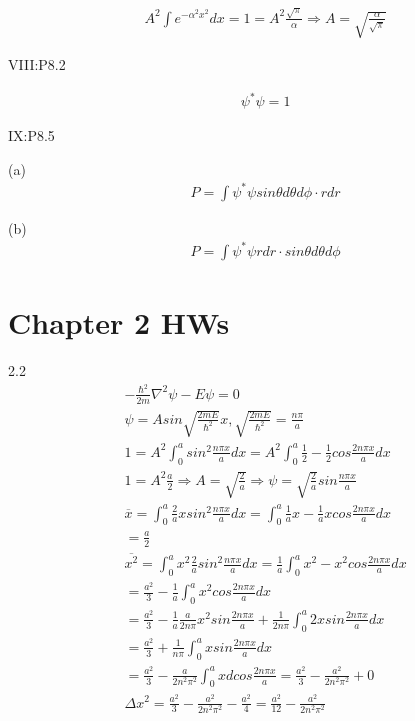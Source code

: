 \documentclass{article}
\begin{document}
  \begin{align*}
    & A^2\int e^{-\alpha^2 x^2}dx=1=A^2\frac{\sqrt{\pi}}{\alpha}\Rightarrow A=\sqrt{\frac{\alpha}{\sqrt{\pi}}}
  \end{align*}

  VIII:P8.2 

  \begin{align*}
    & \psi^*\psi=1
  \end{align*}


  IX:P8.5 

  (a)\begin{align*}
    &P=\int \psi^* \psi sin\theta d\theta d\phi \cdot rdr
  \end{align*}

  (b)\begin{align*}
  & P=\int \psi^*\psi rdr \cdot sin\theta d\theta d\phi
  \end{align*}
  \section{Chapter 2 HWs}
  2.2\begin{align*}
    & -\frac{\hbar^2}{2m}\nabla^2\psi-E\psi=0 \\
    &\psi =Asin\sqrt{\frac{2mE}{\hbar^2}}x,\sqrt{\frac{2mE}{\hbar^2}}=\frac{n\pi}a \\
    &1=A^2\int ^a_0 sin^2\frac{n\pi x}a dx=A^2\int^a_0 \frac12 -\frac12cos\frac{2n\pi x}adx\\
    & 1=A^2 \frac a2\Rightarrow A=\sqrt{\frac2a}\Rightarrow \psi=\sqrt{\frac2a}sin\frac{n\pi x}a \\
    &\overline {x}=\int^a_0 \frac2a x sin^2\frac{n\pi x}a dx=\int^a_0\frac1a x-\frac1axcos\frac{2n\pi x}a dx \\
    & =\frac a2  \\
    &\overline{x^2}=\int^a_0 x^2 \frac2a sin^2\frac{n\pi x}a dx=\frac1a\int^a_0x^2-x^2cos\frac{2n\pi x}adx \\
    &=\frac{a^2}3-\frac1a\int^a_0x^2cos\frac{2n\pi x}a dx \\
    &=\frac{a^2}3-\frac1a\frac{a}{2n\pi}x^2sin\frac{2n\pi x}a+\frac1{2n\pi}\int^a_0 2x sin\frac{2n\pi x}adx  \\
    &=\frac{a^2}3+\frac1{n\pi}\int^a_0 x sin\frac{2n\pi x}adx  \\
    &=\frac{a^2}3-\frac{a}{2n^2\pi^2} \int^a_0 xdcos\frac{2n\pi x}a=\frac{a^2}3-\frac{a^2}{2n^2\pi^2}+0 \\
    &\Delta x^2=\frac{a^2}3-\frac{a^2}{2n^2\pi^2}-\frac{a^2}4=\frac{a^2}{12}-\frac{a^2}{2n^2\pi^2} \\
  \end{align*}
\end{document}
